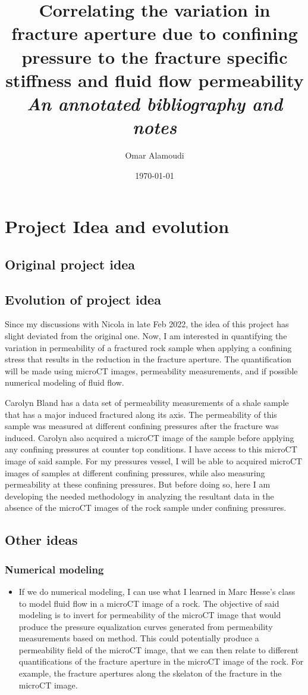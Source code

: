 \documentclass[11pt,titlepage]{article}
\title{Correlating the variation in fracture aperture due to confining pressure to the fracture specific stiffness and fluid flow permeability\\
\emph{An annotated bibliography and notes}}
\author{Omar Alamoudi}
\date{\today}
\begin{document}
\maketitle
\section{Project Idea and evolution}
\subsection{Original project idea}

\subsection{Evolution of project idea}
Since my discussions with Nicola in late Feb 2022, the idea of this project has slight deviated from the original one. Now, I am interested in quantifying the variation in permeability of a fractured rock sample when applying a confining stress that results in the reduction in the fracture aperture. The quantification will be made using microCT images, permeability measurements, and if possible numerical modeling of fluid flow. 

Carolyn Bland has a data set of permeability measurements of a shale sample that has a major induced fractured along its axis. The permeability of this sample was measured at different confining pressures after the fracture was induced. Carolyn also acquired a microCT image of the sample before applying any confining pressures at counter top conditions. I have access to this microCT image of said sample. For my pressures vessel, I will be able to acquired microCT images of samples at different confining pressures, while also measuring permeability at these confining pressures. But before doing so, here I am developing the needed methodology in analyzing the resultant data in the absence of the microCT images of the rock sample under confining pressures.

\subsection{Other ideas}
\subsubsection{Numerical modeling}
\begin{itemize}
\item If we do numerical modeling, I can use what I learned in Marc Hesse's class to model fluid flow in a microCT image of a rock. The objective of said modeling is to invert for permeability of the microCT image that would produce the pressure equalization curves generated from permeability measurements based on \citep{Brace1968} method. This could potentially produce a permeability field of the microCT image, that we can then relate to different quantifications of the fracture aperture in the microCT image of the rock. For example, the fracture apertures along the skelaton of the fracture in the microCT image.
\end{itemize}
\end{document}
